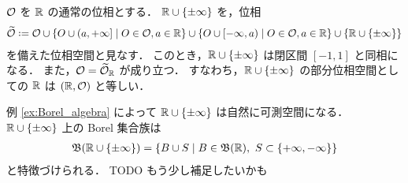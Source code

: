 \begin{example}
    $\mathcal{O}$ を $\mathbb{R}$ の通常の位相とする．
    $\mathbb{R}\cup\{\pm\infty\}$ を，位相
    \begin{align}
        \widetilde\Ocal\defeq\Ocal\cup\{O\cup(a,+\infty]\mid O\in\Ocal, a\in\Rbb\}\cup\{O\cup[-\infty,a)\mid O\in\Ocal, a\in\Rbb\}\cup\{\Rbb\cup\{\pm\infty\}\}
        \label{eqn:extended_real_topology}
    \end{align}
    を備えた位相空間と見なす．
    このとき，$\mathbb{R}\cup\{\pm\infty\}$ は閉区間 $[-1,1]$ と同相になる．
    また，$\mathcal{O}=\widetilde{\mathcal{O}}_{\mathbb{R}}$ が成り立つ．
    すなわち，$\mathbb{R}\cup\{\pm\infty\}$ の部分位相空間としての $\mathbb{R}$ は $(\mathbb{R},\mathcal{O})$ と等しい．

    例 \ref{ex:Borel_algebra} によって $\mathbb{R}\cup\{\pm\infty\}$ は自然に可測空間になる．
    $\mathbb{R}\cup\{\pm\infty\}$ 上の Borel 集合族は
    \begin{align*}
        \mathfrak{B}(\mathbb{R}\cup\{\pm\infty\})
        =\{B\cup S\mid B\in\mathfrak{B}(\mathbb{R}),\ S\subset\{+\infty,-\infty\}\}
    \end{align*}
    と特徴づけられる．
    {\color{red} TODO もう少し補足したいかも}
\end{example}
